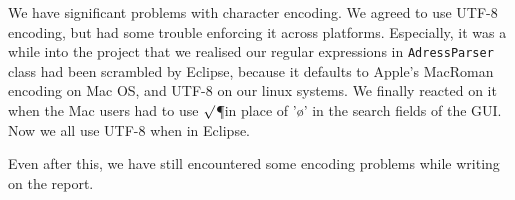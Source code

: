 
We have significant problems with character encoding. We agreed to use UTF-8 encoding, but had some trouble enforcing it across platforms. Especially, it was a while into the project that we realised our regular expressions in \texttt{AdressParser} class had been scrambled by Eclipse, because it defaults to Apple's MacRoman encoding on Mac OS, and UTF-8 on our linux systems. 
We finally reacted on it when the Mac users had to use $\surd$\P in place of '\o' in the search fields of the GUI. Now we all use UTF-8 when in Eclipse. 

Even after this, we have still encountered some encoding problems while writing on the report.
